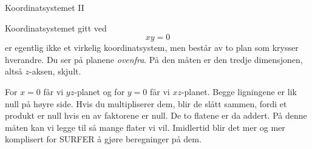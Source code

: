 \documentclass[no]{./../../common/SurferDesc}%
\begin{document}
\footnotesize
%

\begin{surferPage}
  \begin{surferTitle}Koordinatsystemet II\end{surferTitle}
   
   \begin{surferText}
Koordinatsystemet gitt ved 
\[xy=0\]
er egentlig ikke et virkelig koordinatsystem, men består av to plan som krysser hverandre. 
Du ser på planene {\it ovenfra}. På den måten er den tredje dimensjonen, altså $z$-aksen, skjult. 
\vspace{0.3cm}

For $x=0$ får vi $yz$-planet og for $y=0$ får vi $xz$-planet. Begge ligningene er lik null på høyre side. 
Hvis du multipliserer dem, blir de slått sammen, fordi et produkt er null hvis en av faktorene er null.
 De to flatene er da addert. På denne måten kan vi legge til så mange flater vi vil. 
 Imidlertid blir det mer og mer komplisert for SURFER å gjøre beregninger på dem.
\end{surferText}
\end{surferPage}
\end{document}

